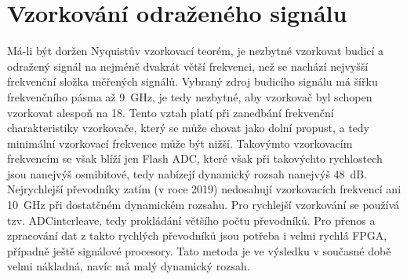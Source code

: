 \chapter{Vzorkování odraženého signálu}
Má-li být doržen Nyquistův vzorkovací teorém, je nezbytné vzorkovat budicí a odražený signál na nejméně dvakrát větší frekvenci, než se nachází nejvyšší frekvenční složka měřených signálů. Vybraný zdroj budicího signálu má šířku frekvenčního pásma až \SI{9}{\giga\hertz}, je tedy nezbytné, aby vzorkovač byl schopen vzorkovat alespoň na \SI{18}{\gigasample}. Tento vztah platí při zanedbání frekvenční charakteristiky vzorkovače, který se může chovat jako dolní propust, a tedy minimální vzorkovací frekvence může být nižší. Takovýmto vzorkovacím frekvencím se však blíží jen Flash \acrshort{ADC}, které však při takovýchto rychlostech jsou nanejvýš osmibitové, tedy nabízejí dynamický rozsah nanejvýš \SI{48}{\deci\bel}. Nejrychlejší převodníky zatím (v roce 2019) nedosahují vzorkovacích frekvencí ani \SI{10}{\giga\hertz} při dostatčném dynamickém rozsahu. Pro rychlejší vzorkování se používá tzv. \gls{ADCinterleave}, tedy prokládání většího počtu převodníků. Pro přenos a zpracování dat z takto rychlých převodníků jsou potřeba i velmi rychlá FPGA, případně ještě signálové procesory. Tato metoda je ve výsledku v současné době velmi nákladná, navíc má malý dynamický rozsah.

